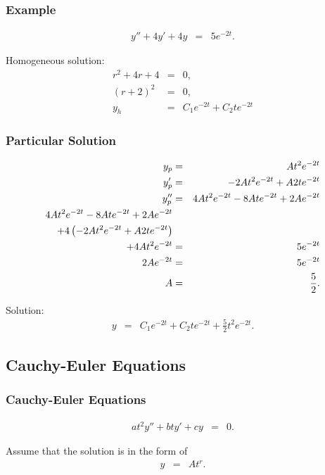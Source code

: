 \begin{frame}
  \frametitle{Example}

  \begin{eqnarray*}
    y'' + 4y' + 4y & = & 5 e^{-2t}.
  \end{eqnarray*}

  {
    Homogeneous solution:
    \begin{eqnarray*}
      r^2 + 4r + 4 & = & 0, \\
      (r+2)^2 & = & 0, \\
      y_h & = & C_1 e^{-2t} + C_2 t e^{-2t}
    \end{eqnarray*}
  }

\end{frame}

\begin{frame}
  \frametitle{Particular Solution}

  \begin{eqnarray*}
    y_p & = & A t^2 e^{-2t} \\
    y_p' & = & -2 A t^2 e^{-2t} + A 2t e^{-2t} \\
    y_p'' & = & 4 A t^2 e^{-2t} - 8A t e^{-2t} + 2 A e^{-2t} \\
    4 A t^2 e^{-2t} - 8A t e^{-2t} + 2 A e^{-2t} & & \\
    + 4 \left( -2 A t^2 e^{-2t} + A 2t e^{-2t} \right) & & \\
    + 4 A t^2 e^{-2t} & = & 5 e^{-2t} \\
    2 A e^{-2t} & = & 5 e^{-2t} \\
    A & = & \frac{5}{2}.
  \end{eqnarray*}

  Solution:
  \begin{eqnarray*}
    y & = & C_1 e^{-2t} + C_2 t e^{-2 t} + \frac{5}{2} t^2 e^{-2t}.
  \end{eqnarray*}

\end{frame}

\subsection{Cauchy-Euler Equations}

\begin{frame}
  \frametitle{Cauchy-Euler Equations}

  \begin{eqnarray*}
    a t^2 y'' + b t y' + c y & = & 0.
  \end{eqnarray*}

  {
    Assume that the solution is in the form of
    \begin{eqnarray*}
      y & = & A t^r.
    \end{eqnarray*}
  }

\end{frame}


